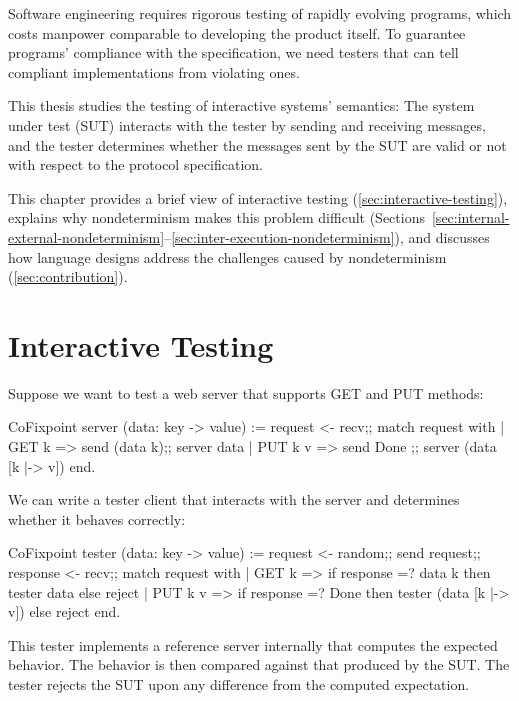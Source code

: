 Software engineering requires rigorous testing of rapidly evolving programs,
which costs manpower comparable to developing the product itself.  To guarantee
programs' compliance with the specification, we need testers that can tell
compliant implementations from violating ones.

This thesis studies the testing of interactive systems' semantics: The system
under test (SUT) interacts with the tester by sending and receiving messages,
and the tester determines whether the messages sent by the SUT are valid or not
with respect to the protocol specification.

This chapter provides a brief view of interactive testing
(\autoref{sec:interactive-testing}), explains why nondeterminism makes this
problem difficult
(Sections~\ref{sec:internal-external-nondeterminism}--\ref{sec:inter-execution-nondeterminism}),
and discusses how language designs address the challenges caused by
nondeterminism (\autoref{sec:contribution}).

\section{Interactive Testing}
\label{sec:interactive-testing}
Suppose we want to test a web server that supports GET and PUT methods:
\begin{coq}
  CoFixpoint server (data: key -> value) :=
    request <- recv;;
    match request with
    | GET k   => send (data k);; server  data
    | PUT k v => send  Done   ;; server (data [k |-> v])
    end.
\end{coq}
We can write a tester client that interacts with the server and determines
whether it behaves correctly:
\begin{coq}
  CoFixpoint tester (data: key -> value) :=
    request <- random;;
    send request;;
    response <- recv;;
    match request with
    | GET k   => if response =? data k
                 then tester data
                 else reject
    | PUT k v => if response =? Done
                 then tester (data [k |-> v])
                 else reject
    end.
\end{coq}
This tester implements a reference server internally that computes the expected
behavior.  The behavior is then compared against that produced by the SUT.  The
tester rejects the SUT upon any difference from the computed expectation.

